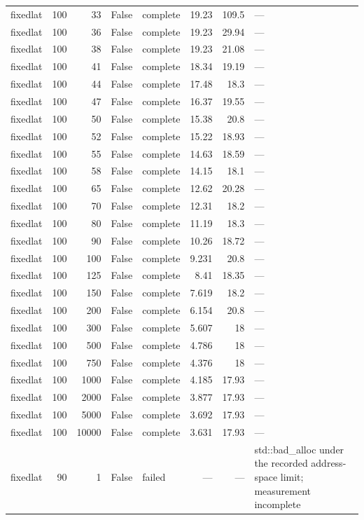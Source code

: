 \begin{tabular}{lrrrlrrl}
fixedlat & 100 & 33 & False & complete & 19.23 & 109.5 & — \\
fixedlat & 100 & 36 & False & complete & 19.23 & 29.94 & — \\
fixedlat & 100 & 38 & False & complete & 19.23 & 21.08 & — \\
fixedlat & 100 & 41 & False & complete & 18.34 & 19.19 & — \\
fixedlat & 100 & 44 & False & complete & 17.48 & 18.3 & — \\
fixedlat & 100 & 47 & False & complete & 16.37 & 19.55 & — \\
fixedlat & 100 & 50 & False & complete & 15.38 & 20.8 & — \\
fixedlat & 100 & 52 & False & complete & 15.22 & 18.93 & — \\
fixedlat & 100 & 55 & False & complete & 14.63 & 18.59 & — \\
fixedlat & 100 & 58 & False & complete & 14.15 & 18.1 & — \\
fixedlat & 100 & 65 & False & complete & 12.62 & 20.28 & — \\
fixedlat & 100 & 70 & False & complete & 12.31 & 18.2 & — \\
fixedlat & 100 & 80 & False & complete & 11.19 & 18.3 & — \\
fixedlat & 100 & 90 & False & complete & 10.26 & 18.72 & — \\
fixedlat & 100 & 100 & False & complete & 9.231 & 20.8 & — \\
fixedlat & 100 & 125 & False & complete & 8.41 & 18.35 & — \\
fixedlat & 100 & 150 & False & complete & 7.619 & 18.2 & — \\
fixedlat & 100 & 200 & False & complete & 6.154 & 20.8 & — \\
fixedlat & 100 & 300 & False & complete & 5.607 & 18 & — \\
fixedlat & 100 & 500 & False & complete & 4.786 & 18 & — \\
fixedlat & 100 & 750 & False & complete & 4.376 & 18 & — \\
fixedlat & 100 & 1000 & False & complete & 4.185 & 17.93 & — \\
fixedlat & 100 & 2000 & False & complete & 3.877 & 17.93 & — \\
fixedlat & 100 & 5000 & False & complete & 3.692 & 17.93 & — \\
fixedlat & 100 & 10000 & False & complete & 3.631 & 17.93 & — \\
fixedlat & 90 & 1 & False & failed & — & — & std::bad\_alloc under the recorded address-space limit; measurement incomplete \\

\end{tabular}
